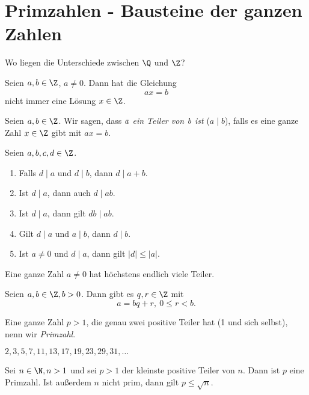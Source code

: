 \chapter[Primzahlen]{Primzahlen - Bausteine der ganzen Zahlen}


Wo liegen die Unterschiede zwischen $\Q$ und $\Z$?

\begin{exmp*}
	Seien $a,b \in \Z$, $a\neq 0$. Dann hat die Gleichung
	\[ ax = b \]
	nicht immer eine Lösung $x \in \Z$.
\end{exmp*}

\begin{defn*}[Teiler]
	Seien $a,b \in \Z$. Wir sagen, dass \emph{$\emph{a}$ ein Teiler von $\emph{b}$ ist} ($a \mid b$), falls es eine ganze Zahl $x \in \Z$ gibt mit $ax = b$.
\end{defn*}

\begin{lem}\autolabel
	Seien $a,b,c,d \in \Z$.
	\begin{enumerate}[label={\roman*})]
		\item Falls $d \mid a$ und $d \mid b$, dann $d \mid a+b$.
		\item Ist $d \mid a$, dann auch $d \mid ab$.
		\item Ist $d \mid a$, dann gilt $db \mid ab$.
		\item Gilt $d \mid a$ und $a \mid b$, dann $d \mid b$.
		\item Ist $a \neq 0$ und $d \mid a$, dann gilt $|d| \leq |a|$.
	\end{enumerate}
\end{lem}

\begin{rem*}
	Eine ganze Zahl $a \neq 0$ hat höchstens endlich viele Teiler.
\end{rem*}

\begin{thm}\autolabel
	Seien $a,b \in \Z, b > 0$. Dann gibt es $q,r \in \Z$ mit
	\[ a = bq + r, \ 0 \leq r < b. \]
\end{thm}

\begin{defn*}[Primzahl]
	Eine ganze Zahl $p > 1$, die genau zwei positive Teiler hat (1 und sich selbst), nenn wir \emph{Primzahl}.
\end{defn*}

\begin{exmp*}
	\( 2,3,5,7,11,13,17,19,23,29,31,\dotsc \)
\end{exmp*}

\begin{lem}\autolabel
	Sei $n \in \N, n > 1$ und sei $p>1$ der kleinste positive Teiler von $n$. Dann ist $p$ eine Primzahl. Ist außerdem $n$ nicht prim, dann gilt $p \leq \sqrt{n}$.
\end{lem}